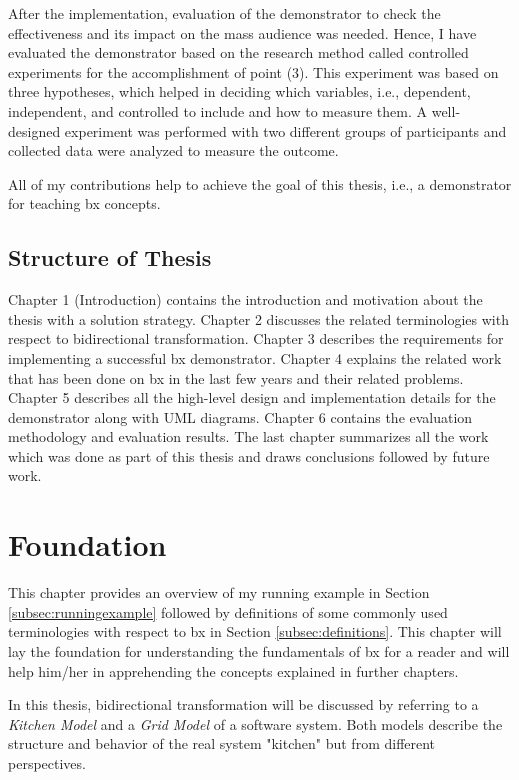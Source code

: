 After the implementation, evaluation of the demonstrator to check the effectiveness and its impact on the mass audience was needed. Hence, I have evaluated the demonstrator based on the research method called controlled experiments \cite{semethods} for the accomplishment of point (3). This experiment was based on three hypotheses, which helped in deciding which variables, i.e., dependent, independent, and controlled to include and how to measure them. A well-designed experiment was performed with two different groups of participants and collected data were analyzed to measure the outcome.

All of my contributions help to achieve the goal of this thesis, i.e., a demonstrator for teaching bx concepts.

\subsection{Structure of Thesis}\label{subsec:structure}

Chapter 1 (Introduction) contains the introduction and motivation about the thesis with a solution strategy. Chapter 2 discusses the related terminologies with respect to bidirectional transformation. Chapter 3 describes the requirements for implementing a successful bx demonstrator. Chapter 4 explains the related work that has been done on bx in the last few years and their related problems. Chapter 5 describes all the high-level design and implementation details for the demonstrator along with UML diagrams. Chapter 6 contains the evaluation methodology and evaluation results. The last chapter summarizes all the work which was done as part of this thesis and draws conclusions followed by future work.

\clearpage
\section{Foundation}\label{sec:foundation}
This chapter provides an overview of my running example in Section \ref{subsec:runningexample} followed by definitions of some commonly used terminologies with respect to bx in Section \ref{subsec:definitions}. This chapter will lay the foundation for understanding the fundamentals of bx for a reader and will help him/her in apprehending the concepts explained in further chapters.

In this thesis, bidirectional transformation will be discussed by referring to a \textit{Kitchen Model} and a \textit{Grid Model} of a software system. Both models describe the structure and behavior of the real system "kitchen" but from different perspectives.

